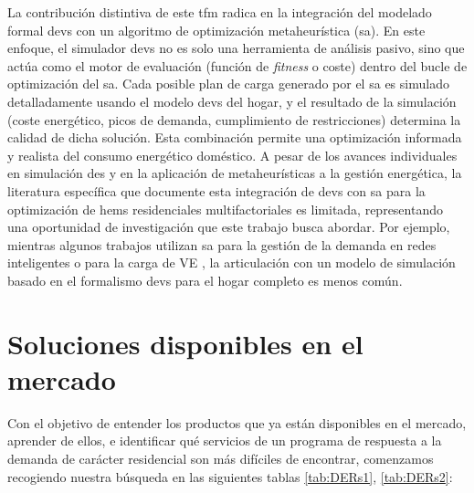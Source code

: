 \documentclass[11pt,a4paper]{book}
\begin{document}
La contribución distintiva de este \gls{tfm} radica en la integración del modelado formal \gls{devs} con un algoritmo de optimización metaheurística (\gls{sa}). En este enfoque, el simulador \gls{devs} no es solo una herramienta de análisis pasivo, sino que actúa como el motor de evaluación (función de \textit{fitness} o coste) dentro del bucle de optimización del \gls{sa}. Cada posible plan de carga generado por el \gls{sa} es simulado detalladamente usando el modelo \gls{devs} del hogar, y el resultado de la simulación (coste energético, picos de demanda, cumplimiento de restricciones) determina la calidad de dicha solución. Esta combinación permite una optimización informada y realista del consumo energético doméstico. A pesar de los avances individuales en simulación \gls{des} y en la aplicación de metaheurísticas a la gestión energética, la literatura específica que documente esta integración de \gls{devs} con \gls{sa} para la optimización de \gls{hems} residenciales multifactoriales es limitada, representando una oportunidad de investigación que este trabajo busca abordar. Por ejemplo, mientras algunos trabajos utilizan \gls{sa} para la gestión de la demanda en redes inteligentes o para la carga de VE \cite{Logenthiran2012, Rajasekhar2021}, la articulación con un modelo de simulación basado en el formalismo \gls{devs} para el hogar completo es menos común.


\section{Soluciones disponibles en el mercado}
Con el objetivo de entender los productos que ya están disponibles en el mercado, aprender de ellos, e identificar qué servicios de un programa de respuesta a la demanda de carácter residencial son más difíciles de encontrar, comenzamos recogiendo nuestra búsqueda en las siguientes tablas \ref{tab:DERs1}, \ref{tab:DERs2}:

\renewcommand{\arraystretch}{1.3} 
\end{document}
